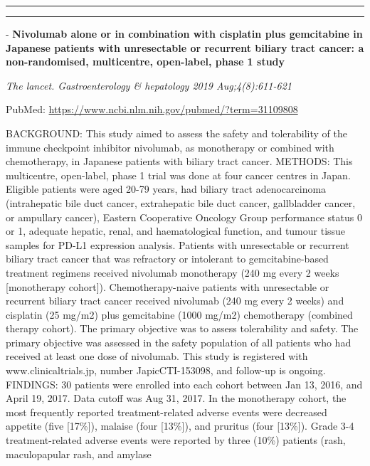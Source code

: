 \documentclass[]{article}
\begin{document}
\begin{center}\rule{0.5\linewidth}{\linethickness}\end{center}

\begin{center}\rule{0.5\linewidth}{\linethickness}\end{center}

 - \textbf{Nivolumab alone or in combination with cisplatin plus
gemcitabine in Japanese patients with unresectable or recurrent biliary
tract cancer: a non-randomised, multicentre, open-label, phase 1 study}

\emph{The lancet. Gastroenterology \& hepatology 2019 Aug;4(8):611-621}

PubMed: \url{https://www.ncbi.nlm.nih.gov/pubmed/?term=31109808}

BACKGROUND: This study aimed to assess the safety and tolerability of
the immune checkpoint inhibitor nivolumab, as monotherapy or combined
with chemotherapy, in Japanese patients with biliary tract cancer.
METHODS: This multicentre, open-label, phase 1 trial was done at four
cancer centres in Japan. Eligible patients were aged 20-79 years, had
biliary tract adenocarcinoma (intrahepatic bile duct cancer,
extrahepatic bile duct cancer, gallbladder cancer, or ampullary cancer),
Eastern Cooperative Oncology Group performance status 0 or 1, adequate
hepatic, renal, and haematological function, and tumour tissue samples
for PD-L1 expression analysis. Patients with unresectable or recurrent
biliary tract cancer that was refractory or intolerant to
gemcitabine-based treatment regimens received nivolumab monotherapy (240
mg every 2 weeks {[}monotherapy cohort{]}). Chemotherapy-naive patients
with unresectable or recurrent biliary tract cancer received nivolumab
(240 mg every 2 weeks) and cisplatin (25 mg/m2) plus gemcitabine (1000
mg/m2) chemotherapy (combined therapy cohort). The primary objective was
to assess tolerability and safety. The primary objective was assessed in
the safety population of all patients who had received at least one dose
of nivolumab. This study is registered with www.clinicaltrials.jp,
number JapicCTI-153098, and follow-up is ongoing. FINDINGS: 30 patients
were enrolled into each cohort between Jan 13, 2016, and April 19, 2017.
Data cutoff was Aug 31, 2017. In the monotherapy cohort, the most
frequently reported treatment-related adverse events were decreased
appetite (five {[}17\%{]}), malaise (four {[}13\%{]}), and pruritus
(four {[}13\%{]}). Grade 3-4 treatment-related adverse events were
reported by three (10\%) patients (rash, maculopapular rash, and amylase
\end{document}
